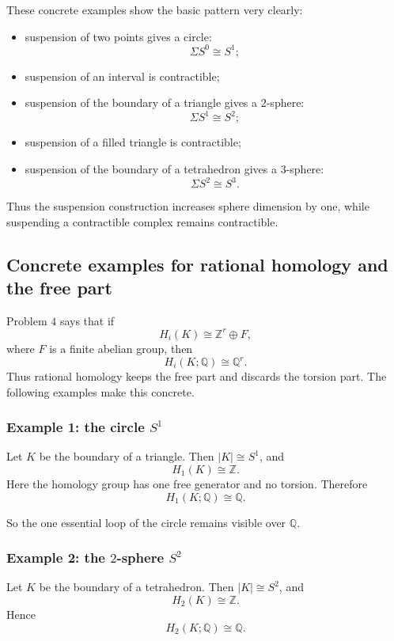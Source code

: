 \documentclass[12pt,a4paper]{article}
\theoremstyle{notespace}
\begin{document}
These concrete examples show the basic pattern very clearly:

\begin{itemize}
	\item suspension of two points gives a circle:
	\[
	\Sigma S^0\cong S^1;
	\]
	\item suspension of an interval is contractible;
	\item suspension of the boundary of a triangle gives a \(2\)-sphere:
	\[
	\Sigma S^1\cong S^2;
	\]
	\item suspension of a filled triangle is contractible;
	\item suspension of the boundary of a tetrahedron gives a \(3\)-sphere:
	\[
	\Sigma S^2\cong S^3.
	\]
\end{itemize}

Thus the suspension construction increases sphere dimension by one, while suspending a contractible complex remains contractible.

\subsection{Concrete examples for rational homology and the free part}

Problem \(4\) says that if
\[
H_i(K)\cong \mathbb Z^r\oplus F,
\]
where \(F\) is a finite abelian group, then
\[
H_i(K;\mathbb Q)\cong \mathbb Q^r.
\]
Thus rational homology keeps the free part and discards the torsion part. The following examples make this concrete.

\subsubsection*{Example 1: the circle \(S^1\)}

Let \(K\) be the boundary of a triangle. Then \(|K|\cong S^1\), and
\[
H_1(K)\cong \mathbb Z.
\]
Here the homology group has one free generator and no torsion. Therefore
\[
H_1(K;\mathbb Q)\cong \mathbb Q.
\]

So the one essential loop of the circle remains visible over \(\mathbb Q\).

\subsubsection*{Example 2: the \(2\)-sphere \(S^2\)}

Let \(K\) be the boundary of a tetrahedron. Then \(|K|\cong S^2\), and
\[
H_2(K)\cong \mathbb Z.
\]
Hence
\[
H_2(K;\mathbb Q)\cong \mathbb Q.
\]
\end{document}
